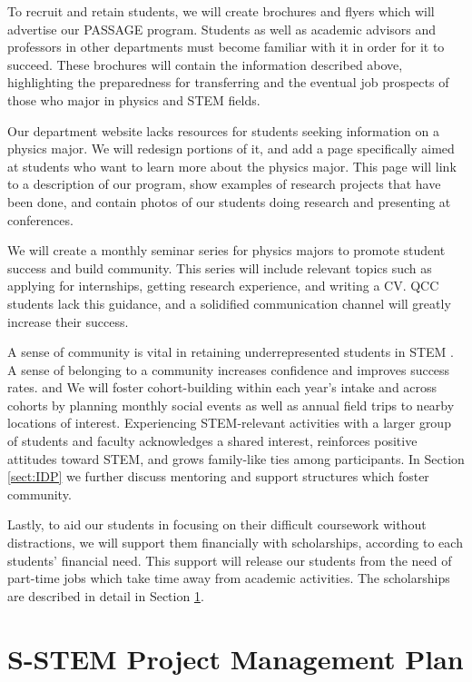 \documentclass[12pt]{article}
\begin{document}
To recruit and retain students, we will create brochures and flyers which will advertise our PASSAGE program.  Students as well as academic advisors and professors in other departments must become familiar with it in order for it to succeed.  These brochures will contain the information described above, highlighting the preparedness for transferring and the eventual job prospects of those who major in physics and STEM fields. 

Our department website lacks resources for students seeking information on a physics major.  We will redesign portions of it, and add a page specifically aimed at students who want to learn more about the physics major.  This page will link to a description of our program, show examples of research projects that have been done, and contain photos of our students doing research and presenting at conferences.
	
We will create a monthly seminar series for physics majors to promote student success and build community.  This series will include relevant topics such as applying for internships, getting research experience, and writing a CV.  QCC students lack this guidance, and a solidified communication channel will greatly increase their success.

A sense of community is vital in retaining underrepresented students in STEM \citep[][and references therein]{NAP25257}.  A sense of belonging to a community increases confidence and improves success rates.   and We will foster cohort-building within each year's intake and across cohorts by planning monthly social events as well as annual field trips to nearby locations of interest.  Experiencing STEM-relevant activities with a larger group of students and faculty acknowledges a shared interest, reinforces positive attitudes toward STEM, and grows family-like ties among participants.  In Section \ref{sect:IDP} we further discuss mentoring and support structures which foster community.

Lastly, to aid our students in focusing on their difficult coursework without distractions, we will support them financially with scholarships, according to each students' financial need.  This support will release our students from the need of part-time jobs which take time away from academic activities.  The scholarships are described in detail in Section \ref{sect:money}.



\section{S-STEM Project Management Plan}\label{sect:money}
\end{document}
